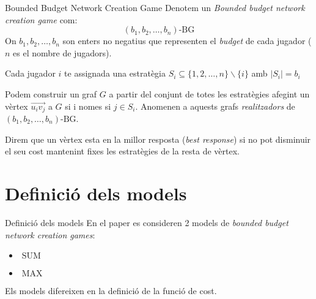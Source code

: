\documentclass[aspectratio=169]{beamer}
\DeclareMathOperator{\SUM}{SUM}
\DeclareMathOperator{\MAX}{MAX}
\begin{document}
\begin{frame}{Bounded Budget Network Creation Game}
    Denotem un \emph{Bounded budget network creation game} com:
    $$ (b_1, b_2, \dots , b_n)\text{-BG} $$
    On $b_1,b_2, \dots , b_n$ son enters no negatius que representen el \emph{budget} de cada jugador ($n$ es el nombre de jugadors).
    
    \vspace{3mm}
    
    Cada jugador $i$ te assignada una estratègia $S_i \subseteq \{1, 2, \dots , n\} \backslash \{i\}$ amb
    $|S_i| = b_i$
    
    \vspace{3mm}
    
    Podem construir un graf $G$ a partir del conjunt de totes les estratègies afegint un vèrtex $\vec{u_iv_j}$
    a $G$ si i nomes si $j \in S_i$. Anomenen a aquests grafs \emph{realitzadors} de
    $ (b_1, b_2, \dots , b_n)\text{-BG} $.
    
    \vspace{3mm}
    
    Direm que un vèrtex esta en la millor resposta (\emph{best response}) si no pot disminuir el seu
    cost mantenint fixes les estratègies de la resta de vèrtex.
\end{frame}


\section{Definició dels models}

\begin{frame}{Definició dels models}
    En el paper\cite{ehsani_bounded_2015} es consideren 2 models de \emph{bounded budget network creation games}:
    
    \vspace{1.5em}
    
    \begin{itemize}
    \item $\SUM$
    \item $\MAX$
    \end{itemize}
    
    \vspace{3em}
    
    Els models difereixen en la definició de la funció de cost.
\end{frame}
\end{document}
